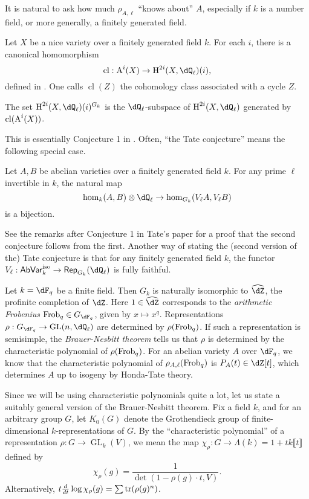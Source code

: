 It is natural to ask how much $\rho_{A,\ell}$ ``knows about'' $A$, especially 
if $k$ is a number field, or more generally, a finitely generated field. 

Let $X$ be a nice variety over a finitely generated field $k$. For each $i$, 
there is a canonical homomorphism 
\[
  \operatorname{cl}:\chow^i(X) \to \h^{2 i}(X,\dQ_\ell)(i)\text{,}
\]
defined in \cite[VI 2.2.10]{de77}. One calls $\operatorname{cl}(Z)$ the 
cohomology class associated with a cycle $Z$. 

\begin{conjecture}[Tate]
The set $\h^{2 i}(X,\dQ_\ell)(i)^{G_k}$ is the $\dQ_\ell$-subspace of $\h^{2 i}(X,\dQ_\ell)$ 
generated by $\operatorname{cl}(\operatorname{A}^i(X))$. 
\end{conjecture}

This is essentially Conjecture 1 in \cite{ta65}. Often, ``the Tate conjecture'' 
means the following special case. 

\begin{conjecture}[Tate]
Let $A,B$ be abelian varieties over a finitely generated field $k$. For any 
prime $\ell$ invertible in $k$, the natural map 
\[
  \hom_k(A,B)\otimes\dQ_\ell \to \hom_{G_k}(V_\ell A, V_\ell B) 
\]
is a bijection. 
\end{conjecture}

See the remarks after Conjecture 1 in Tate's paper for a proof that the second 
conjecture follows from the first. Another way of stating the (second version 
of the) Tate conjecture is that for any finitely generated field $k$, the 
functor $V_\ell:\mathsf{AbVar}_k^\text{iso} \to \mathsf{Rep}_{G_k}(\dQ_\ell)$ 
is fully faithful. 

\begin{example}
Let $k=\dF_q$ be a finite field. Then $G_k$ is naturally isomorphic to 
$\widehat\dZ$, the profinite completion of $\dZ$. Here $1\in \widehat\dZ$ 
corresponds to the \emph{arithmetic Frobenius} $\frob_q\in G_{\dF_q}$, given by 
$x\mapsto x^q$. Representations 
$\rho:G_{\dF_q} \to \gl{n}{\dQ_\ell}$ are determined by 
$\rho(\mathrm{Frob}_q)$. If such a representation is semisimple, the 
\emph{Brauer-Nesbitt theorem} tells us that $\rho$ is determined by the 
characteristic polynomial of $\rho(\mathrm{Frob}_q)$. For an abelian variety $A$ over 
$\dF_q$, we know that the characteristic polynomial of 
$\rho_{A,\ell}(\mathrm{Frob}_q)$ is $P_A(t)\in \dZ[t]$, which determines $A$ up to 
isogeny by Honda-Tate theory. 
\end{example}

Since we will be using characteristic polynomials quite a lot, let us state a 
suitably general version of the Brauer-Nesbitt theorem. Fix a field $k$, and 
for an arbitrary group $G$, let $K_0(G)$ denote the Grothendieck group of 
finite-dimensional $k$-representations of $G$. By the ``characteristic 
polynomial'' of a representation $\rho:G \to \operatorname{GL}_k(V)$, we mean 
the map $\chi_\rho:G\to \Lambda(k)=1+t k\llbracket t\rrbracket$ defined by 
\[
  \chi_\rho(g) = \frac{1}{\det(1-\rho(g)\cdot t, V)} \text{.}
\]
Alternatively, $t\frac{d}{dt} \log \chi_\rho(g) = \sum \operatorname{tr}(\rho(g)^n)$. 

